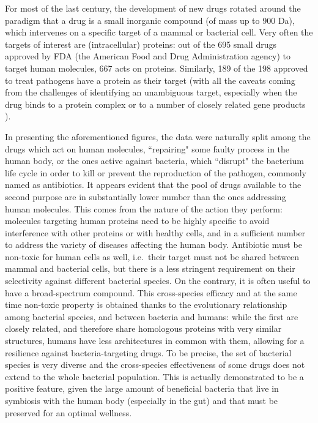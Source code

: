 For most of the last century, the development of new drugs rotated around the paradigm that a drug is a small inorganic compound (of mass up to 900 Da), which intervenes on a specific target of a mammal or bacterial cell. Very often the targets of interest are (intracellular) proteins: out of the 695 small drugs approved by FDA (the American Food and Drug Administration agency) to target human molecules, 667 acts on proteins. Similarly, 189 of the 198 approved to treat pathogens have a protein as their target \cite{Santos2017}
%
(with all the caveats coming from the challenges of identifying an unambiguous target, especially when the drug binds to a protein complex or to a number of closely related gene products \cite{Santos2017}).

In presenting the aforementioned figures, the data were naturally split among the drugs which act on human molecules, ``repairing" some faulty process in the human body, or the ones active against bacteria, which ``disrupt" the bacterium life cycle in order to kill or prevent the reproduction of the pathogen, commonly named as antibiotics.
%
It appears evident that the pool of drugs available to the second purpose are in substantially lower number than the ones addressing human molecules. This comes from the nature of the action they perform: molecules targeting human proteins need to be highly specific to avoid interference with other proteins or with healthy cells, and in a sufficient number to address the variety of diseases affecting the human body.
%
Antibiotic must be non-toxic for human cells as well, i.e.\ their target must not be shared between mammal and bacterial cells, but there is a less stringent requirement on their selectivity against different bacterial species. On the contrary, it is often useful to have a broad-spectrum compound. This cross-species efficacy and at the same time non-toxic property is obtained thanks to the evolutionary relationship among bacterial species, and between bacteria and humans: while the first are closely related, and therefore share homologous proteins with very similar structures, humans have less architectures in common with them, allowing for a resilience against bacteria-targeting drugs.
%
To be precise, the set of bacterial species is very diverse and the cross-species effectiveness of some drugs does not extend to the whole bacterial population. This is actually demonstrated to be a positive feature, given the large amount of beneficial bacteria that live in symbiosis with the human body (especially in the gut) and that must be preserved for an optimal wellness.


